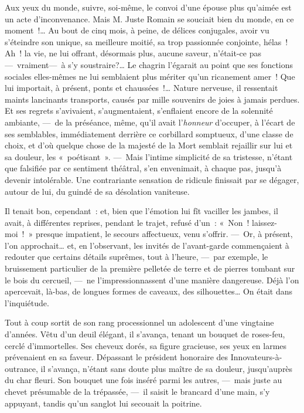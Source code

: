 \documentclass[french,twoside]{book} %
\begin{document}
Aux yeux du monde, suivre, soi-même, le convoi d’une épouse plus qu’aimée est un acte d’inconvenance. Mais M. Juste Romain se souciait bien du monde, en ce moment !… Au bout de cinq mois, à peine, de délices conjugales, avoir vu s’éteindre son unique, sa meilleure moitié, sa trop passionnée conjointe, hélas ! Ah ! la vie, ne lui offrant, désormais plus, aucune saveur, n’était-ce pas— vraiment— à s’y soustraire?… Le chagrin l’égarait au point que ses fonctions sociales elles-mêmes ne lui semblaient plus mériter qu’un ricanement amer ! Que lui importait, à présent, ponts et chaussées !…   Nature nerveuse, il ressentait maints lancinants transports, causés par mille souvenirs de joies à jamais perdues. Et ses regrets s’avivaient, s’augmentaient, s’enflaient encore de la solennité ambiante, — de la préséance, même, qu’il avait l’\emph{honneur} d’occuper, à l’écart de ses semblables, immédiatement derrière ce corbillard somptueux, d’une classe de choix, et d’où quelque chose de la majesté de la Mort semblait rejaillir sur lui et sa douleur, les « poétisant ». — Mais l’intime simplicité de sa tristesse, n’étant que falsifiée par ce sentiment théâtral, s’en envenimait, à chaque pas, jusqu’à devenir intolérable. Une contrariante sensation de ridicule finissait par se dégager, autour de lui, du guindé de sa désolation vaniteuse.\par
Il tenait bon, cependant : et, bien que l’émotion lui fît vaciller les jambes, il avait, à différentes reprises, pendant le trajet, refusé d’un : « Non ! laissez-moi ! » presque impatient, le secours affectueux, venu s’offrir. — Or, à présent, l’on approchait… et, en l’observant, les invités de l’avant-garde commençaient à redouter   que certains détails suprêmes, tout à l’heure, — par exemple, le bruissement particulier de la première pelletée de terre et de pierres tombant sur le bois du cercueil, — ne l’impressionnassent d’une manière dangereuse. Déjà l’on apercevait, là-bas, de longues formes de caveaux, des silhouettes… On était dans l’inquiétude.\par
Tout à coup sortit de son rang processionnel un adolescent d’une vingtaine d’années. Vêtu d’un deuil élégant, il s’avança, tenant un bouquet de roses-feu, cerclé d’immortelles. Ses cheveux dorés, sa figure gracieuse, ses yeux en larmes prévenaient en sa faveur. Dépassant le président honoraire des Innovateurs-à-outrance, il s’avança, n’étant sans doute plus maître de sa douleur, jusqu’auprès du char fleuri. Son bouquet une fois inséré parmi les autres, — mais juste au chevet présumable de la trépassée, — il saisit le brancard d’une main, s’y appuyant, tandis qu’un sanglot lui secouait la poitrine.\par
\end{document}
